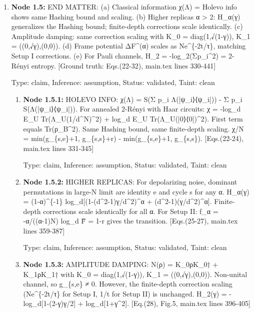 \documentclass{article}
\begin{document}
\begin{enumerate}
\begin{enumerate}
\end{enumerate}
\item \textbf{Node 1.5:} END MATTER: (a) Classical information χ(Λ) = Holevo info shows same Hashing bound and scaling. (b) Higher replicas α > 2: H\_α(γ) generalizes the Hashing bound; finite-depth corrections scale identically. (c) Amplitude damping: same correction scaling with K\_0 = diag(1,√(1-γ)), K\_1 = ((0,√γ),(0,0)). (d) Frame potential ΔF\textasciicircum{}(α) scales as Ne\textasciicircum{}\{-2t/τ\}, matching Setup I corrections. (e) For Pauli channels, H\_2 = -log\_2(Σp\_i\textasciicircum{}2) = 2-Rényi entropy. [Ground truth: Eqs.(22-32), main.tex lines 330-441]

  Type: claim, Inference: assumption, Status: validated, Taint: clean

\begin{enumerate}
\item \textbf{Node 1.5.1:} HOLEVO INFO: χ(Λ) = S(Σ p\_i Λ(|ψ\_i⟩⟨ψ\_i|)) - Σ p\_i S(Λ(|ψ\_i⟩⟨ψ\_i|)). For annealed 2-Rényi with Haar circuits: χ = -log\_d E\_U Tr(Λ\_U(1/d\textasciicircum{}N)\textasciicircum{}2) + log\_d E\_U Tr(Λ\_U(|0⟩⟨0|)\textasciicircum{}2). First term equals Tr(ρ\_B\textasciicircum{}2). Same Hashing bound, same finite-depth scaling. χ/N = min(g\_\{s,e\}+1, g\_\{s,s\}+r) - min(g\_\{s,e\}+1, g\_\{s,s\}). [Eqs.(22-24), main.tex lines 331-345]

  Type: claim, Inference: assumption, Status: validated, Taint: clean

\item \textbf{Node 1.5.2:} HIGHER REPLICAS: For depolarizing noise, dominant permutations in large-N limit are identity e and cycle s for any α. H\_α(γ) = (1-α)\textasciicircum{}\{-1\} log\_d[(1-(d\textasciicircum{}2-1)γ/d\textasciicircum{}2)\textasciicircum{}α + (d\textasciicircum{}2-1)(γ/d\textasciicircum{}2)\textasciicircum{}α]. Finite-depth corrections scale identically for all α. For Setup II: f\_α = -α/((α-1)N) log\_d F̃ = 1-r gives the transition. [Eqs.(25-27), main.tex lines 359-387]

  Type: claim, Inference: assumption, Status: validated, Taint: clean

\item \textbf{Node 1.5.3:} AMPLITUDE DAMPING: N(ρ) = K\_0ρK\_0† + K\_1ρK\_1† with K\_0 = diag(1,√(1-γ)), K\_1 = ((0,√γ),(0,0)). Non-unital channel, so g\_\{s,e\} ≠ 0. However, the finite-depth correction scaling (Ne\textasciicircum{}\{-2t/τ\} for Setup I, 1/t for Setup II) is unchanged. H\_2(γ) = -log\_d[1-(2-γ)γ/2] + log\_d[1+γ\textasciicircum{}2]. [Eq.(28), Fig.5, main.tex lines 396-405]


\end{enumerate}
\end{enumerate}
\end{document}
